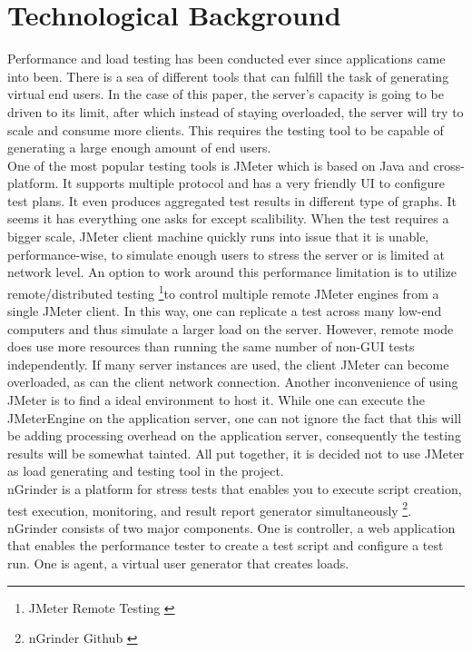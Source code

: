 
\chapter{Technological Background}
\label{technological background}
Performance and load testing has been conducted ever since applications came into been. There is a sea of different tools that can fulfill the task of generating virtual end users. In the case of this paper, the server's capacity is going to be driven to its limit, after which instead of staying overloaded, the server will try to scale and consume more clients. This requires the testing tool to be capable of generating a large enough amount of end users. \\
One of the most popular testing tools is JMeter which is based on Java and cross-platform. It supports multiple protocol and has a very friendly UI to configure test plans. It even produces aggregated test results in different type of graphs. It seems it has everything one asks for except scalibility. When the test requires a bigger scale, JMeter client machine quickly runs into issue that it is unable, performance-wise, to simulate enough users to stress the server or is limited at network level. An option to work around this performance limitation is to utilize remote/distributed testing \footnote{JMeter Remote Testing \cite{JMeterRemote}}to control multiple remote JMeter engines from a single JMeter client. In this way, one can replicate a test across many low-end computers and thus simulate a larger load on the server. However, remote mode does use more resources than running the same number of non-GUI tests independently. If many server instances are used, the client JMeter can become overloaded, as can the client network connection. Another inconvenience of using JMeter is to find a ideal environment to host it. While one can execute the JMeterEngine on the application server, one can not ignore the fact that this will be adding processing overhead on the application server, consequently  the testing results will be somewhat tainted. All put together, it is decided not to use JMeter as load generating and testing tool in the project. \\
nGrinder is a platform for stress tests that enables you to execute script creation, test execution, monitoring, and result report generator simultaneously \footnote{nGrinder Github \cite{NGrinder}}. nGrinder consists of two major components. One is  controller, a web application that enables the performance tester to create a test script and configure a test run. One is agent, a virtual user generator that creates loads. 
